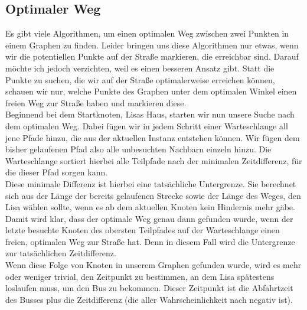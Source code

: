 \documentclass[a4paper,10pt,ngerman]{scrartcl}
\begin{document}
\subsection{Optimaler Weg}
Es gibt viele Algorithmen, um einen optimalen Weg zwischen zwei Punkten in einem Graphen zu finden. Leider bringen uns diese Algorithmen nur etwas, wenn wir die potentiellen Punkte auf der Stra\ss e markieren, die erreichbar sind. Darauf möchte ich jedoch verzichten, weil es einen besseren Ansatz gibt. Statt die Punkte zu suchen, die wir auf der Stra\ss e optimalerweise erreichen können, schauen wir nur, welche Punkte des Graphen unter dem optimalen Winkel einen freien Weg zur Stra\ss e haben und markieren diese.\\
Beginnend bei dem Startknoten, Lisas Haus, starten wir nun unsere Suche nach dem optimalen Weg. Dabei fügen wir in jedem Schritt einer Warteschlange all jene Pfade hinzu, die aus der aktuellen Instanz entstehen können. Wir fügen dem bisher gelaufenen Pfad also alle unbesuchten Nachbarn einzeln hinzu. Die Warteschlange sortiert hierbei alle Teilpfade nach der minimalen Zeitdifferenz, für die dieser Pfad sorgen kann.\\
Diese minimale Differenz ist hierbei eine tatsächliche Untergrenze. Sie berechnet sich aus der Länge der bereits gelaufenen Strecke sowie der Länge des Weges, den Lisa wählen sollte, wenn es ab dem aktuellen Knoten kein Hindernis mehr gäbe. Damit wird klar, dass der optimale Weg genau dann gefunden wurde, wenn der letzte besuchte Knoten des obersten Teilpfades auf der Warteschlange einen freien, optimalen Weg zur Stra\ss e hat. Denn in diesem Fall wird die Untergrenze zur tatsächlichen Zeitdifferenz.\\
Wenn diese Folge von Knoten in unserem Graphen gefunden wurde, wird es mehr oder weniger trivial, den Zeitpunkt zu bestimmen, an dem Lisa spätestens loslaufen muss, um den Bus zu bekommen. Dieser Zeitpunkt ist die Abfahrtzeit des Busses plus die Zeitdifferenz (die aller Wahrscheinlichkeit nach negativ ist).
\end{document}
